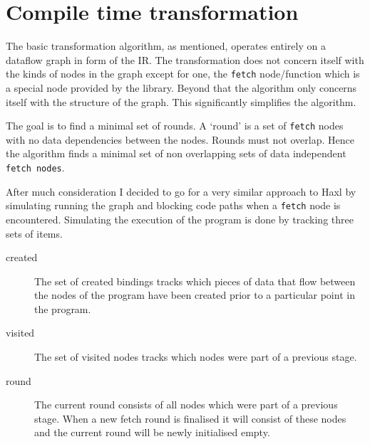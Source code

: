 \section{Compile time transformation}

The basic \yauhau{} transformation algorithm, as mentioned, operates entirely on a dataflow graph in form of the IR.
The transformation does not concern itself with the kinds of nodes in the graph except for one, the \texttt{fetch} node/function which is a special node provided by the \yauhau{} library.
Beyond that the algorithm only concerns itself with the structure of the graph.
This significantly simplifies the algorithm.

The goal is to find a minimal set of rounds.
A `round' is a set of \texttt{fetch} nodes with no data dependencies between the nodes.
Rounds must not overlap.
Hence the algorithm finds a minimal set of non overlapping sets of data independent \texttt{fetch nodes}.

After much consideration I decided to go for a very similar approach to Haxl by simulating running the graph and blocking code paths when a \texttt{fetch} node is encountered.
Simulating the execution of the program is done by tracking three sets of items.

\begin{description}
	\item[created] The set of created bindings tracks which pieces of data that flow between the nodes of the program have been created prior to a particular point in the program.
	\item[visited] The set of visited nodes tracks which nodes were part of a previous stage.
	\item[round] The current round consists of all \fetch{} nodes which were part of a previous stage.
	When a new fetch round is finalised it will consist of these \fetch{} nodes and the current round will be newly initialised empty.
\end{description}

